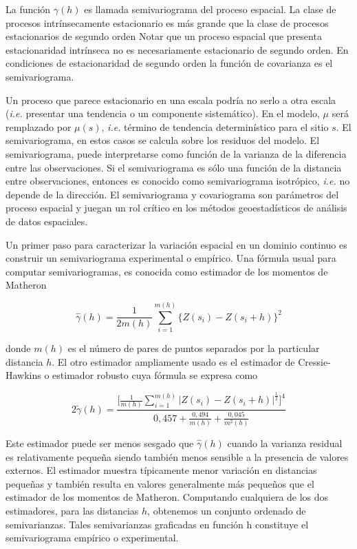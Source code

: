 \documentclass[11pt,b5paper,]{krantz}
\begin{document}
La función \(\gamma(h)\) es llamada semivariograma del proceso espacial. La clase de procesos intrínsecamente estacionario es más grande que la clase de procesos estacionarios de segundo orden Notar que un proceso espacial que presenta estacionaridad intrínseca no es necesariamente estacionario de segundo orden. En condiciones de estacionaridad de segundo orden la función de covarianza es el semivariograma.

Un proceso que parece estacionario en una escala podría no serlo a otra escala (\emph{i.e.} presentar una tendencia o un componente sistemático). En el modelo, \(\mu\) será remplazado por \(\mu(s)\), \emph{i.e.} término de tendencia determinístico para el sitio \(s\). El semivariograma, en estos casos se calcula sobre los residuos del modelo. El semivariograma, puede interpretarse como función de la varianza de la diferencia entre las observaciones. Si el semivariograma es sólo una función de la distancia entre observaciones, entonces es conocido como semivariograma isotrópico, \emph{i.e.} no depende de la dirección. El semivariograma y covariograma son parámetros del proceso espacial y juegan un rol crítico en los métodos geoestadísticos de análisis de datos espaciales.

Un primer paso para caracterizar la variación espacial en un dominio continuo es construir un semivariograma experimental o empírico. Una fórmula usual para computar semivariogramas, es conocida como estimador de los momentos de Matheron

\[\hat{\gamma}(h)=\frac{1}{2 m (h)}\sum_{i=1}^{m(h)} \Big\{Z(s_i)-Z(s_i+h) \Big\}^2\]

donde \(m(h)\) es el número de pares de puntos separados por la particular distancia \(h\). El otro estimador ampliamente usado es el estimador de Cressie- Hawkins o estimador robusto cuya fórmula se expresa como

\[2 \widetilde{\gamma}(h)= \frac{\Big[ \frac{1}{m(h)} \sum_{i=1}^{m(h)} \Big| Z(s_i) - Z(s_i + h) \Big| ^\frac{1}{2}  \Big] ^4}{0,457 + \frac{0,494}{m(h)} + \frac{0,045}{m^2(h)}}\]

Este estimador puede ser menos sesgado que \(\hat{\gamma}(h)\) cuando la varianza residual es relativamente pequeña siendo también menos sensible a la presencia de valores externos. El estimador muestra típicamente menor variación en distancias pequeñas y también resulta en valores generalmente más pequeños que el estimador de los momentos de Matheron. Computando cualquiera de los dos estimadores, para las distancias \(h\), obtenemos un conjunto ordenado de semivarianzas. Tales semivarianzas graficadas en función h constituye el semivariograma empírico o experimental.
\end{document}
